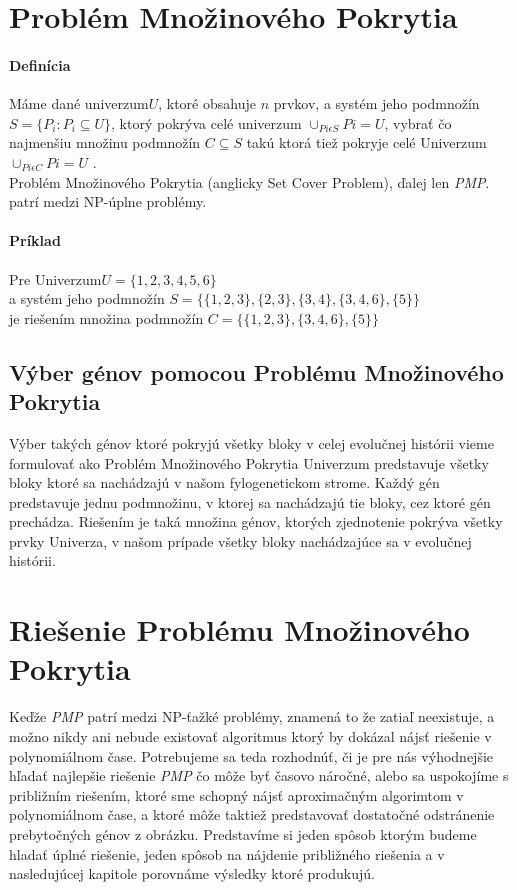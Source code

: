 \section{Problém Množinového Pokrytia}
\paragraph{Definícia}
Máme dané univerzum$U$, ktoré obsahuje $n$ prvkov, a systém jeho podmnožín \(S=\{ P_i : P_i \subseteq U \}\), 
ktorý pokrýva celé univerzum \(\cup_{Pi \epsilon S} Pi = U\),
vybrať čo najmenšiu množinu podmnožín \(C \subseteq S\)
takú ktorá tiež pokryje celé Univerzum \(\cup_{Pi \epsilon C} Pi = U \) .\\
Problém Množinového Pokrytia (anglicky Set Cover Problem), ďalej len \emph{PMP}. patrí medzi NP-úplne problémy.%
\paragraph{Príklad}
Pre Univerzum$U=\{1,2,3,4,5,6\}$ \\a systém jeho podmnožín
$S=\{\{1,2,3\},\{2,3\},\{3,4\},\{3,4,6\},\{5\}\}$ \\
je riešením množina podmnožín $C=\{\{1,2,3\},\{3,4,6\},\{5\}\}$ 
\subsection{Výber génov pomocou Problému Množinového Pokrytia}
Výber takých génov ktoré pokryjú všetky bloky v celej evolučnej histórii vieme formulovať
ako Problém Množinového Pokrytia 
Univerzum predstavuje všetky bloky ktoré sa nachádzajú v našom fylogenetickom strome.
Každý gén predstavuje jednu podmnožinu, v ktorej sa nachádzajú tie bloky, cez ktoré gén prechádza.
Riešením je taká množina génov, ktorých zjednotenie pokrýva všetky prvky Univerza, v našom prípade všetky bloky nachádzajúce sa v evolučnej histórii.
\section{Riešenie Problému Množinového Pokrytia}
Keďže \emph{PMP} patrí medzi NP-ťažké problémy, znamená to že zatiaľ neexistuje,
a možno nikdy ani nebude existovať algoritmus ktorý by dokázal nájsť riešenie v polynomiálnom čase.
Potrebujeme sa teda rozhodnúť, či je pre nás výhodnejšie hľadať najlepšie riešenie \emph{PMP} 
čo môže byť časovo náročné,
alebo sa uspokojíme s približním riešením, ktoré sme schopný nájsť aproximačným algorimtom v polynomiálnom čase,
a ktoré môže taktiež predstavovať dostatočné odstránenie prebytočných génov z obrázku.
Predstavíme si jeden spôsob ktorým budeme hladať úplné riešenie, jeden spôsob na nájdenie približného riešenia a v
nasledujúcej kapitole porovnáme výsledky ktoré produkujú. 
